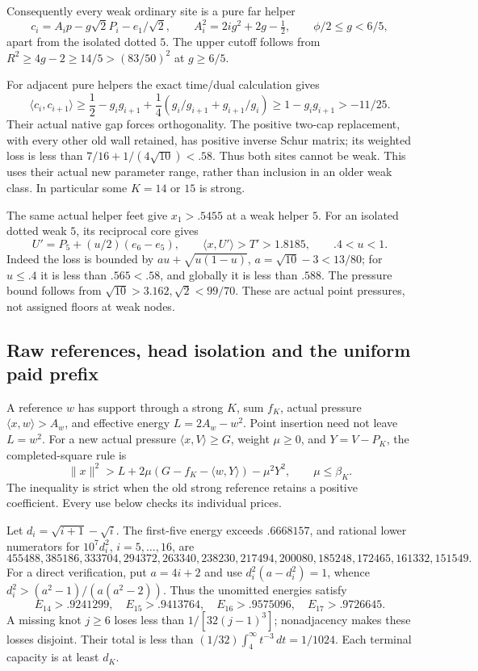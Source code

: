\documentclass[11pt]{article}
\theoremstyle{definition}
\theoremstyle{remark}
\newcommand{\ip}[2]{\langle #1,#2\rangle}
\newcommand{\norm}[1]{\lVert #1\rVert}
\begin{document}
Consequently every weak ordinary site is a pure far helper
\[
 c_i=A_i p-g\sqrt2P_i-e_1/\sqrt2,\qquad
 A_i^2=2ig^2+2g-\tfrac12,\qquad
 \phi/2\leq g<6/5,
\]
apart from the isolated dotted \(5\).
The upper cutoff follows from
\(R^2\geq4g-2\geq14/5>(83/50)^2\) at \(g\geq6/5\).

For adjacent pure helpers the exact time/dual calculation gives
\[
 \ip{c_i}{c_{i+1}}
 \geq \frac12-g_i g_{i+1}
           +\frac14(g_i/g_{i+1}+g_{i+1}/g_i)
 \geq1-g_i g_{i+1}>-11/25.
\]
Their actual native gap forces orthogonality. The positive two-cap
replacement, with every other old wall retained, has positive
inverse Schur matrix; its weighted loss is less than
\(7/16+1/(4\sqrt{10})<.58\).
Thus both sites cannot be weak. This uses their actual new
parameter range, rather than inclusion in an older weak class.
In particular some \(K=14\) or \(15\) is strong.

The same actual helper feet give \(x_1>.5455\) at a weak
helper \(5\). For an isolated dotted weak \(5\), its reciprocal
core gives
\[
 U'=P_5+(u/2)(e_6-e_5),\qquad
 \ip x{U'}>T'>1.8185,\qquad .4<u<1.
\]
Indeed the loss is bounded by
\(a u+\sqrt{u(1-u)}\), \(a=\sqrt{10}-3<13/80\);
for \(u\leq.4\) it is less than \(.565<.58\), and globally
it is less than \(.588\).
The pressure bound follows from
\(\sqrt{10}>3.162,\sqrt2<99/70\).
These are actual point pressures, not assigned floors at weak nodes.

\subsection{Raw references, head isolation and the uniform paid prefix}
\label{app:B18references}
A reference \(w\) has support through a strong \(K\), sum \(f_K\),
actual pressure \(\ip xw>A_w\), and effective energy
\(L=2A_w-w^2\). Point insertion need not leave \(L=w^2\).
For a new actual pressure \(\ip xV\geq G\), weight \(\mu\geq0\),
and \(Y=V-P_K\), the completed-square rule is
\[
 \norm x^2>L+2\mu(G-f_K-\ip wY)-\mu^2Y^2,
 \qquad \mu\leq\beta_K .
\]
The inequality is strict when the old strong reference retains
a positive coefficient. Every use below checks its individual prices.

Let \(d_i=\sqrt{i+1}-\sqrt i\).
The first-five energy exceeds \(.6668157\), and rational lower
numerators for \(10^7d_i^2\), \(i=5,\ldots,16\), are
\[
 455488,385186,333704,294372,263340,238230,
 217494,200080,185248,172465,161332,151549.
\]
For a direct verification, put \(a=4i+2\) and use
\(d_i^2(a-d_i^2)=1\), whence
\(d_i^2>(a^2-1)/(a(a^2-2))\).
Thus the unomitted energies satisfy
\[
 E_{14}>.9241299,\quad E_{15}>.9413764,\quad
 E_{16}>.9575096,\quad E_{17}>.9726645.
\]
A missing knot \(j\geq6\) loses less than
\(1/[32(j-1)^3]\); nonadjacency makes these losses disjoint.
Their total is less than
\((1/32)\int_4^\infty t^{-3}\,dt=1/1024\).
Each terminal capacity is at least \(d_K\).
\end{document}
